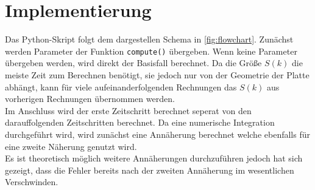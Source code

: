 \chapter[Implementierung (eigene Leistung)]{Implementierung}
\label{chap:Implementation}


Das Python-Skript folgt dem dargestellen Schema in \ref{fig:flowchart}. Zunächst werden Parameter der Funktion \texttt{compute()} übergeben. Wenn keine Parameter übergeben werden, wird direkt der Basisfall berechnet. Da die Größe $S(k)$ die meiste Zeit zum Berechnen benötigt, sie jedoch nur von der Geometrie der Platte abhängt, kann für viele aufeinanderfolgenden Rechnungen das $S(k)$ aus vorherigen Rechnungen übernommen werden.\\ 
Im Anschluss wird der erste Zeitschritt berechnet seperat von den darauffolgenden Zeitschritten berechnet. Da eine numerische Integration durchgeführt wird, wird zunächst eine Annäherung berechnet welche ebenfalls für eine zweite Näherung genutzt wird.\\
Es ist theoretisch möglich weitere Annäherungen durchzuführen jedoch hat sich gezeigt, dass die Fehler bereits nach der zweiten Annäherung im wesentlichen Verschwinden.


